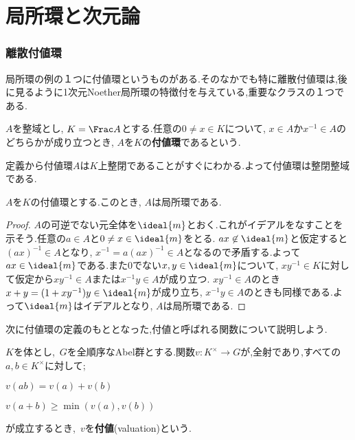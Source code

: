 \newpage
\part[Local ring and Dimension theory]{局所環と次元論}

\section{離散付値環}

局所環の例の１つに付値環というものがある.そのなかでも特に離散付値環は,後に見るように1次元Noether局所環の特徴付を与えている,重要なクラスの１つである.

\begin{defi}[付値環]
	$A$を整域とし, $K=\Frac A$とする.任意の$0\neq x\in K$について, $x\in A$か$x^{-1}\in A$のどちらかが成り立つとき, $A$を$K$の\textbf{付値環}であるという.
\end{defi}

定義から付値環$A$は$K$上整閉であることがすぐにわかる.よって付値環は整閉整域である.

\begin{prop}
	$A$を$K$の付値環とする.このとき, $A$は局所環である.
\end{prop}

\begin{proof}
	$A$の可逆でない元全体を$\ideal{m}$とおく.これがイデアルをなすことを示そう.任意の$a\in A$と$0\neq x\in\ideal{m}$をとる. $ax\not\in\ideal{m}$と仮定すると$(ax)^{-1}\in A$となり, $x^{-1}=a(ax)^{-1}\in A$となるので矛盾する.よって$ax\in \ideal{m}$である.また$0$でない$x,y\in\ideal{m}$について, $xy^{-1}\in K$に対して仮定から$xy^{-1}\in A$または$x^{-1}y\in A$が成り立つ. $xy^{-1}\in A$のとき$x+y=(1+xy^{-1})y\in \ideal{m}$が成り立ち, $x^{-1}y\in A$のときも同様である.よって$\ideal{m}$はイデアルとなり, $A$は局所環である.
\end{proof}

次に付値環の定義のもととなった,付値と呼ばれる関数について説明しよう.

\begin{defi}[付値]
	$K$を体とし,~$G$を全順序なAbel群とする.関数$v:K^\times\to G$が,全射であり,すべての$a,b\in K^\times$に対して;
	\begin{sakura}
		\item $v(ab)=v(a)+v(b)$
		\item $v(a+b)\geq\min (v(a),v(b))$
	\end{sakura}
	が成立するとき,~$v$を\textbf{付値}(valuation)という.
\end{defi}

